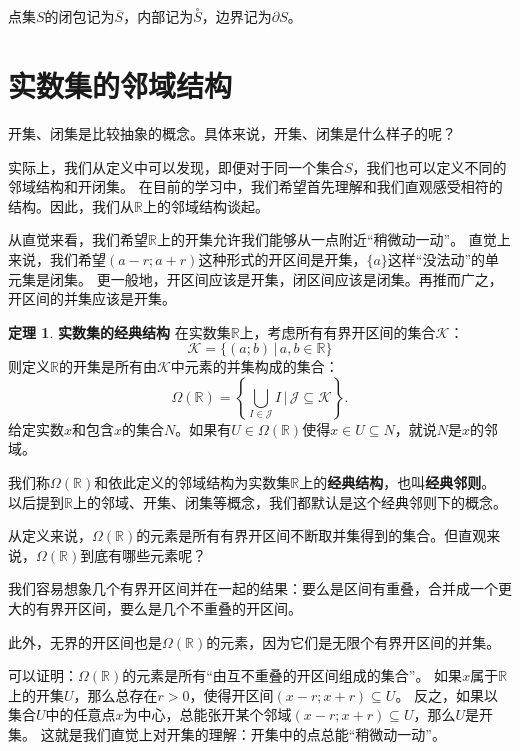 \documentclass[12pt,UTF8]{ctexbook}
\theoremstyle{definition}
\newtheorem{tm}{定理}[section]
\theoremstyle{plain}
\begin{document}
点集$S$的闭包记为$\overline{S}$，内部记为$\overset{\circ}{S}$，边界记为$\partial S$。

\section{实数集的邻域结构}

开集、闭集是比较抽象的概念。具体来说，开集、闭集是什么样子的呢？

实际上，我们从定义中可以发现，即便对于同一个集合$S$，我们也可以定义不同的邻域结构和开闭集。
在目前的学习中，我们希望首先理解和我们直观感受相符的结构。因此，我们从$\mathbb{R}$上的邻域结构谈起。

从直觉来看，我们希望$\mathbb{R}$上的开集允许我们能够从一点附近“稍微动一动”。
直觉上来说，我们希望$(a-r;a+r)$这种形式的开区间是开集，$\{a\}$这样“没法动”的单元集是闭集。
更一般地，开区间应该是开集，闭区间应该是闭集。再推而广之，开区间的并集应该是开集。

\begin{tm}{\textbf{实数集的经典结构}}
    在实数集$\mathbb{R}$上，考虑所有有界开区间的集合$\mathcal{K}$：
    $$ \mathcal{K} = \{ (a;b) \, | \, a, b \in \mathbb{R} \}$$
    则定义$\mathbb{R}$的开集是所有由$\mathcal{K}$中元素的并集构成的集合：
    $$ \Omega(\mathbb{R}) = \left\{\bigcup_{I \in \mathcal{J}} I \, \Bigg| \,\mathcal{J} \subseteq  \mathcal{K} \right\}.$$
    给定实数$x$和包含$x$的集合$N$。如果有$U\in\Omega(\mathbb{R})$使得$x\in U\subseteq N$，就说$N$是$x$的邻域。

    我们称$\Omega(\mathbb{R})$和依此定义的邻域结构为实数集$\mathbb{R}$上的\textbf{经典结构}，也叫\textbf{经典邻则}。
    以后提到$\mathbb{R}$上的邻域、开集、闭集等概念，我们都默认是这个经典邻则下的概念。
\end{tm}

从定义来说，$\Omega(\mathbb{R})$的元素是所有有界开区间不断取并集得到的集合。但直观来说，$\Omega(\mathbb{R})$到底有哪些元素呢？

我们容易想象几个有界开区间并在一起的结果：要么是区间有重叠，合并成一个更大的有界开区间，要么是几个不重叠的开区间。

此外，无界的开区间也是$\Omega(\mathbb{R})$的元素，因为它们是无限个有界开区间的并集。

可以证明：$\Omega(\mathbb{R})$的元素是所有“由互不重叠的开区间组成的集合”。
如果$x$属于$\mathbb{R}$上的开集$U$，那么总存在$r>0$，使得开区间$(x-r;x+r)\subseteq U$。
反之，如果以集合$U$中的任意点$x$为中心，总能张开某个邻域$(x-r;x+r)\subseteq U$，那么$U$是开集。
这就是我们直觉上对开集的理解：开集中的点总能“稍微动一动”。
\end{document}
